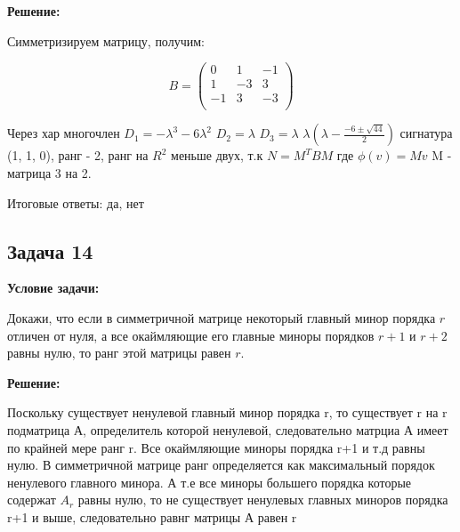 \documentclass[a4paper,12pt]{article}
\begin{document}
\textbf{Решение:}

Симметризируем матрицу, получим: 

\[ B = 
\begin{pmatrix}
    0 & 1 & -1 \\
    1 & -3 & 3 \\
    -1 & 3 & -3 \\
\end{pmatrix}
\]

Через хар многочлен $D_1 = -\lambda^3-6\lambda^2$ $D_2= \lambda$ $D_3 = \lambda$ $\lambda(\lambda - \frac{-6\pm \sqrt{44}}{2})$ сигнатура (1, 1, 0), ранг - 2, ранг на $R^2$ меньше двух, т.к $N = M^TBM$ где $\phi(v) = Mv$ M - матрица 3 на 2.

Итоговые ответы: да, нет
\vspace{1cm}

\subsection{Задача 14}
\textbf{Условие задачи:}

Докажи, что если в симметричной матрице некоторый главный минор порядка $r$ отличен от нуля, а все окаймляющие его главные миноры порядков $r + 1$ и $r + 2$ равны нулю, то ранг этой матрицы равен $r$.

\textbf{Решение:}

Поскольку существует ненулевой главный минор порядка r, то существует r на r подматрица А, определитель которой ненулевой, следовательно матрциа А имеет по крайней мере ранг r. Все окаймляющие миноры порядка r+1 и т.д равны нулю. В симметричной матрице ранг определяется как максимальный порядок ненулевого главного минора. А т.е все миноры большего порядка которые содержат $A_r$ равны нулю, то не существует ненулевых главных миноров порядка r+1 и выше, следовательно равнг матрицы А равен r

\vspace{1cm}
\end{document}

